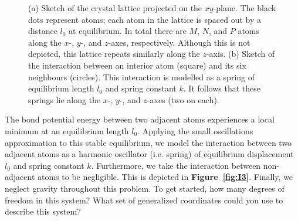 \documentclass[letterpaper,12pt]{article}
\begin{document}
\begin{flushleft}
\begin{figure}[h]
\begin{subfigure}[b]{0.3\textwidth}
        \end{subfigure}
        \caption{(a) Sketch of the crystal lattice projected on the $xy$-plane. The black dots represent atoms; each atom in the lattice is spaced out by a distance $l_0$ at equilibrium. In total there are $M$, $N$, and $P$ atoms along the $x$-, $y$-, and $z$-axes, respectively. Although this is not depicted, this lattice repeats similarly along the $z$-axis. (b) Sketch of the interaction between an interior atom (square) and its six neighbours (circles). This interaction is modelled as a spring of equilibrium length $l_0$ and spring constant $k$. It follows that these springs lie along the $x$-, $y$-, and $z$-axes (two on each).}
    \end{figure}
    The bond potential energy between two adjacent atoms experiences a local minimum at an equilibrium length $l_0$. Applying the small oscillations approximation to this stable equilibrium, we model the interaction between two adjacent atoms as a harmonic oscillator (i.e. spring) of equilibrium displacement $l_0$ and spring constant $k$. Furthermore, we take the interaction between non-adjacent atoms to be negligible. This is depicted in \textbf{Figure~\ref{fig:I3}}. Finally, we neglect gravity throughout this problem.\newline\newline
    To get started, how many degrees of freedom in this system? What set of generalized coordinates could you use to describe this system?

\end{flushleft}
\end{document}
